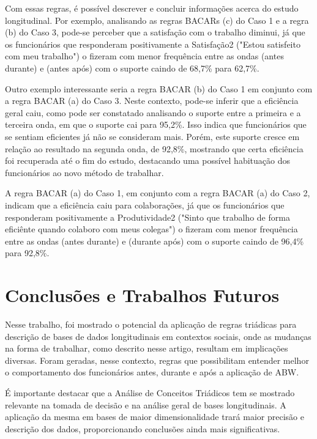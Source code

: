 \documentclass[kdmile,a4paper]{kdmile} %
\begin{document}
Com essas regras, é possível descrever e concluir informações acerca do estudo longitudinal. Por exemplo, analisando as regras BACARs (c) do Caso 1 e a regra (b) do Caso 3, pode-se perceber que a satisfação com o trabalho diminui, já que os funcionários que responderam positivamente a Satisfação2 ("Estou satisfeito com meu trabalho") o fizeram com menor frequência entre as ondas (antes \textrightarrow{} durante) e (antes \textrightarrow{} após) com o suporte caindo de 68,7\% para 62,7\%.

Outro exemplo interessante seria a regra BACAR (b) do Caso 1 em conjunto com a regra BACAR (a) do Caso 3. Neste contexto, pode-se inferir que a eficiência geral caiu, como pode ser constatado analisando o suporte entre a primeira e a terceira onda, em que o suporte cai para 95,2\%. Isso indica que funcionários que se sentiam eficientes já não se consideram mais. Porém, este suporte cresce em relação ao resultado na segunda onda, de 92,8\%, mostrando que certa eficiência foi recuperada até o fim do estudo, destacando uma possível habituação dos funcionários ao novo método de trabalhar.

A regra BACAR (a) do Caso 1, em conjunto com a regra BACAR (a) do Caso 2, indicam que a eficiência caiu para colaborações, já que os funcionários que responderam positivamente a Produtividade2 ("Sinto que trabalho de forma eficiênte quando colaboro com meus colegas") o fizeram com menor frequência entre as ondas (antes \textrightarrow{} durante) e (durante \textrightarrow{} após) com o suporte caindo de 96,4\% para 92,8\%.

 
\section{Conclusões e Trabalhos Futuros}

Nesse trabalho, foi mostrado o potencial da aplicação de regras triádicas para descrição de bases de dados longitudinais em contextos sociais, onde as mudanças na forma de trabalhar, como descrito nesse artigo, resultam em implicações diversas. Foram geradas, nesse contexto, regras que possibilitam entender melhor o comportamento dos funcionários antes, durante e após a aplicação de ABW.

É importante  destacar que a Análise de Conceitos Triádicos tem se mostrado relevante na tomada de decisão e na análise geral de bases longitudinais. A aplicação da mesma em bases de maior dimensionalidade trará maior precisão e descrição dos dados, proporcionando conclusões ainda mais significativas.
\end{document}
